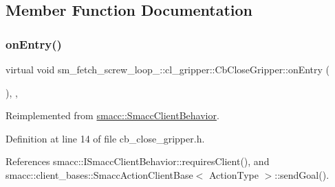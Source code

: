 \subsection{Member Function Documentation}
\mbox{\label{classsm__fetch__screw__loop__1_1_1cl__gripper_1_1CbCloseGripper_a9a0fe49dd77571008f1cf734ec946709}} 
\subsubsection{\texorpdfstring{on\+Entry()}{onEntry()}}
{\footnotesize\ttfamily virtual void sm\+\_\+fetch\+\_\+screw\+\_\+loop\+\_\+::cl\+\_\+gripper\+::\+Cb\+Close\+Gripper\+::on\+Entry (\begin{DoxyParamCaption}{ }\end{DoxyParamCaption})\hspace{0.3cm}{\ttfamily [inline]}, {\ttfamily [override]}, {\ttfamily [virtual]}}



Reimplemented from \hyperlink{classsmacc_1_1SmaccClientBehavior_ad5d3e1f1697c3cfe66c94cadba948493}{smacc\+::\+Smacc\+Client\+Behavior}.



Definition at line 14 of file cb\+\_\+close\+\_\+gripper.\+h.



References smacc\+::\+I\+Smacc\+Client\+Behavior\+::requires\+Client(), and smacc\+::client\+\_\+bases\+::\+Smacc\+Action\+Client\+Base$<$ Action\+Type $>$\+::send\+Goal().


